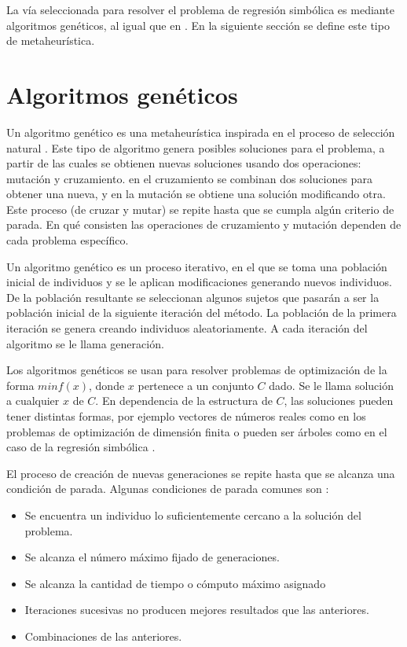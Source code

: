 La vía seleccionada para resolver el problema de regresión simbólica es mediante algoritmos genéticos, al igual que en \cite{gaucel2014learning, iba2008inference, koza1994genetic, kronberger2019identification}. En la siguiente sección se define este tipo de metaheurística.

\section{Algoritmos genéticos}\label{section:genetic_algorithm}

Un algoritmo genético es una metaheurística inspirada en el proceso de selección natural \cite{mitchell1998introduction}. Este tipo de algoritmo genera posibles soluciones para el problema, a partir de las cuales se obtienen nuevas soluciones usando dos operaciones: mutación y cruzamiento. en el cruzamiento se combinan dos soluciones para obtener una nueva, y en la mutación se obtiene una solución modificando otra. Este proceso (de cruzar y mutar) se repite hasta que se cumpla algún criterio de parada. En qué consisten las operaciones de cruzamiento y mutación dependen de cada problema específico.

Un algoritmo genético es un proceso iterativo, en el que se toma una población inicial de individuos y se le aplican modificaciones generando nuevos individuos. De la población resultante se seleccionan algunos sujetos que pasarán a ser la población inicial de la siguiente iteración del método. La población de la primera iteración se genera creando individuos aleatoriamente. A cada iteración del algoritmo se le llama generación.

Los algoritmos genéticos se usan para resolver problemas de optimización de la forma $min f(x)$, donde $x$ pertenece a un conjunto $C$ dado. Se le llama solución a cualquier $x$ de $C$. En dependencia de la estructura de $C$, las soluciones pueden tener distintas formas, por ejemplo vectores de números reales como en los problemas de optimización de dimensión finita \cite{mitchell1998introduction} o pueden ser árboles como en el caso de la regresión simbólica \cite{mitchell1998introduction}.

El proceso de creación de nuevas generaciones se repite hasta que se alcanza una condición de parada. Algunas condiciones de parada comunes son \cite{mitchell1998introduction}:

\begin{itemize}
    \item Se encuentra un individuo lo suficientemente cercano a la solución del problema.
    \item Se alcanza el número máximo fijado de generaciones.
    \item Se alcanza la cantidad de tiempo o cómputo máximo asignado
    \item Iteraciones sucesivas no producen mejores resultados que las anteriores.
    \item Combinaciones de las anteriores.
\end{itemize}


